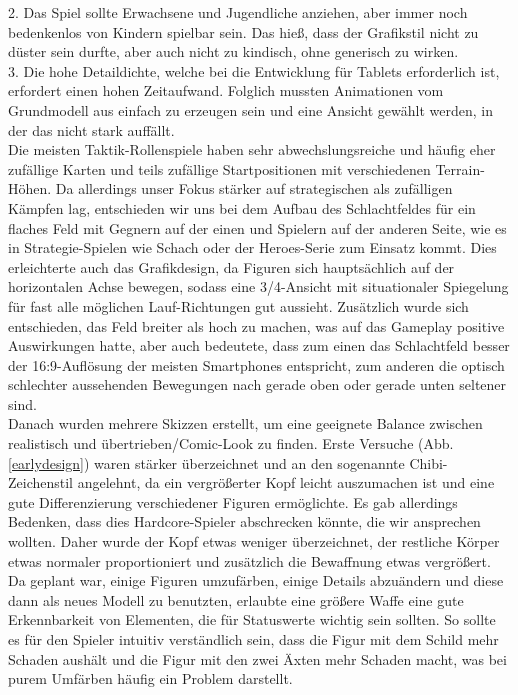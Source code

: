\documentclass[extern,palatino]{cgBA}
\begin{document}
2. Das Spiel sollte Erwachsene und Jugendliche anziehen, aber immer noch bedenkenlos von Kindern spielbar sein. Das hieß, dass der Grafikstil nicht zu düster sein durfte, aber auch nicht zu kindisch, ohne generisch zu wirken.
\\3. Die hohe Detaildichte, welche bei die Entwicklung für Tablets erforderlich ist, erfordert einen hohen Zeitaufwand. Folglich mussten Animationen vom Grundmodell aus einfach zu erzeugen sein und eine Ansicht gewählt werden, in der das nicht stark auffällt.
\\Die meisten Taktik-Rollenspiele haben sehr abwechslungsreiche und häufig eher zufällige Karten und teils zufällige Startpositionen mit verschiedenen Terrain-Höhen. Da allerdings unser Fokus stärker auf strategischen als zufälligen Kämpfen lag, entschieden wir uns bei dem Aufbau des Schlachtfeldes für ein flaches Feld mit Gegnern auf der einen und Spielern auf der anderen Seite, wie es in Strategie-Spielen wie Schach oder der Heroes-Serie zum Einsatz kommt. Dies erleichterte auch das Grafikdesign, da Figuren sich hauptsächlich auf der horizontalen Achse bewegen, sodass eine 3/4-Ansicht mit situationaler Spiegelung für fast alle möglichen Lauf-Richtungen gut aussieht. Zusätzlich wurde sich entschieden, das Feld breiter als hoch zu machen, was auf das Gameplay positive Auswirkungen hatte, aber auch bedeutete, dass zum einen das Schlachtfeld besser der 16:9-Auflösung der meisten Smartphones entspricht, zum anderen die optisch schlechter aussehenden Bewegungen nach gerade oben oder gerade unten seltener sind.
\\Danach wurden mehrere Skizzen erstellt, um eine geeignete Balance zwischen realistisch und übertrieben/Comic-Look zu finden. Erste Versuche (Abb.\ref{earlydesign}) waren stärker überzeichnet und an den sogenannte Chibi-Zeichenstil angelehnt, da ein vergrößerter Kopf leicht auszumachen ist und eine gute Differenzierung verschiedener Figuren ermöglichte. Es gab allerdings Bedenken, dass dies Hardcore-Spieler abschrecken könnte, die wir ansprechen wollten. Daher wurde der Kopf etwas weniger überzeichnet, der restliche Körper etwas normaler proportioniert und zusätzlich die Bewaffnung etwas vergrößert. Da geplant war, einige Figuren umzufärben, einige Details abzuändern und diese dann als neues Modell zu benutzten, erlaubte eine größere Waffe eine gute Erkennbarkeit von Elementen, die für Statuswerte wichtig sein sollten. So sollte es für den Spieler intuitiv verständlich sein, dass die Figur mit dem Schild mehr Schaden aushält und die Figur mit den zwei Äxten mehr Schaden macht, was bei purem Umfärben häufig ein Problem darstellt.
\end{document}
